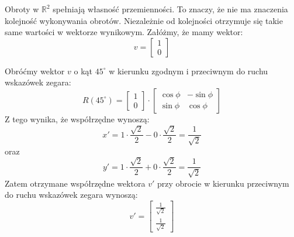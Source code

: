 Obroty w $\mathbb{R}^{2}$ spełniają własność przemienności. To znaczy, że nie ma znaczenia kolejność wykonywania obrotów. Niezależnie od kolejności otrzymuje się takie same wartości w wektorze wynikowym.
Załóżmy, że mamy wektor:
\begin{equation*}
v =
    \begin{bmatrix}
    1 \\
    0
    \end{bmatrix}
\end{equation*}
\begin{przyklad}
Obróćmy wektor $v$ o kąt $45^{\circ}$ w kierunku zgodnym i przeciwnym do ruchu wskazówek zegara:
\begin{equation*}
    R(45^{\circ}) =
    \begin{bmatrix}
    1 \\
    0
    \end{bmatrix}
    \cdot
    \begin{bmatrix}
    \cos\phi & -\sin\phi \\
    \sin\phi & \cos\phi
    \end{bmatrix}
\end{equation*}
Z tego wynika, że współrzędne wynoszą:
\begin{equation*}
    x' = 1 \cdot \frac{\sqrt{2}}{2} - 0 \cdot \frac{\sqrt{2}}{2}
    = \frac{1}{\sqrt{2}}
\end{equation*}
oraz
\begin{equation*}
    y' = 1 \cdot \frac{\sqrt{2}}{2} + 0 \cdot \frac{\sqrt{2}}{2} = \frac{1}{\sqrt{2}}
\end{equation*}
Zatem otrzymane współrzędne wektora $v'$ przy obrocie w kierunku przeciwnym do ruchu wskazówek zegara wynoszą:
\begin{equation*}
v' =
    \begin{bmatrix}
    \frac{1}{\sqrt{2}} \\
    \frac{1}{\sqrt{2}}
    \end{bmatrix}
\end{equation*}


\end{przyklad}
